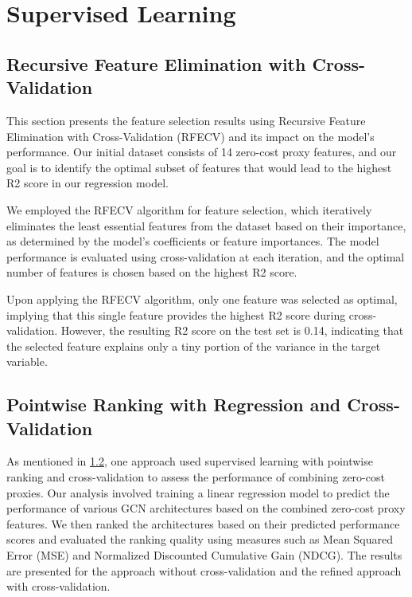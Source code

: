
\section{Supervised Learning}
\subsection{Recursive Feature Elimination with Cross-Validation}
This section presents the feature selection results using Recursive Feature Elimination with Cross-Validation (RFECV) and its impact on the model's performance. Our initial dataset consists of 14 zero-cost proxy features, and our goal is to identify the optimal subset of features that would lead to the highest R2 score in our regression model.

We employed the RFECV algorithm for feature selection, which iteratively eliminates the least essential features from the dataset based on their importance, as determined by the model's coefficients or feature importances. The model performance is evaluated using cross-validation at each iteration, and the optimal number of features is chosen based on the highest R2 score.

Upon applying the RFECV algorithm, only one feature was selected as optimal, implying that this single feature provides the highest R2 score during cross-validation. However, the resulting R2 score on the test set is 0.14, indicating that the selected feature explains only a tiny portion of the variance in the target variable.

\subsection{Pointwise Ranking with Regression and Cross-Validation}


As mentioned in \cref{}, one approach used supervised learning with pointwise ranking and cross-validation to assess the performance of combining zero-cost proxies. Our analysis involved training a linear regression model to predict the performance of various GCN architectures based on the combined zero-cost proxy features. We then ranked the architectures based on their predicted performance scores and evaluated the ranking quality using measures such as Mean Squared Error (MSE) and Normalized Discounted Cumulative Gain (NDCG). The results are presented for the approach without cross-validation and the refined approach with cross-validation.

